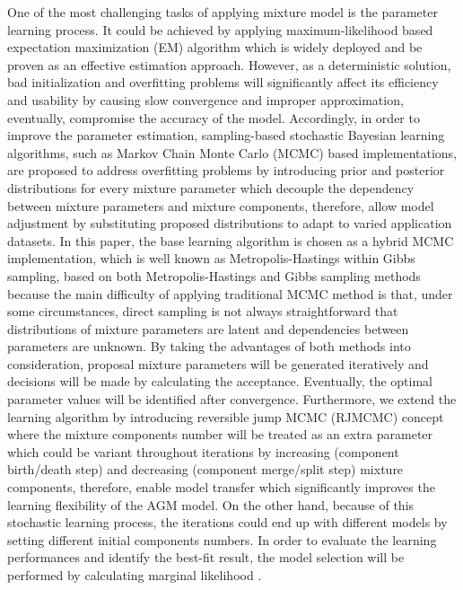 \documentclass[conference]{IEEEtran}
\begin{document}
One of the most challenging tasks of applying mixture model is the parameter learning process. It could be achieved by applying maximum-likelihood based expectation maximization (EM) algorithm \cite{Dempster1977} which is widely deployed and be proven as an effective estimation approach. However, as a deterministic solution, bad initialization and overfitting problems \cite{Bouguila2009} \cite{Bouguila2012} will significantly affect its efficiency and usability by causing slow convergence and improper approximation, eventually, compromise the accuracy of the model. Accordingly, in order to improve the parameter estimation, sampling-based stochastic Bayesian learning algorithms, such as Markov Chain Monte Carlo (MCMC) based implementations, are proposed to address overfitting problems by introducing prior and posterior distributions for every mixture parameter which decouple the dependency between mixture parameters and mixture components, therefore, allow model adjustment by substituting proposed distributions to adapt to varied application datasets. In this paper, the base learning algorithm is chosen as a hybrid MCMC implementation, which is well known as Metropolis-Hastings within Gibbs sampling\cite{Bouguila2009}, based on both Metropolis-Hastings \cite{Hastings1970} and Gibbs sampling \cite{Geman1987} methods because the main difficulty of applying traditional MCMC method is that, under some circumstances, direct sampling is not always straightforward that distributions of mixture parameters are latent and dependencies between parameters are unknown. By taking the advantages of both methods into consideration, proposal mixture parameters will be generated iteratively and decisions will be made by calculating the acceptance. Eventually, the optimal parameter values will be identified after convergence. Furthermore, we extend the learning algorithm by introducing reversible jump MCMC (RJMCMC)\cite{Bouguila2012} concept where the mixture components number will be treated as an extra parameter which could be variant throughout iterations by increasing (component birth/death step) and decreasing (component merge/split step) mixture components, therefore, enable model transfer which significantly improves the learning flexibility of the AGM model. On the other hand, because of this stochastic learning process, the iterations could end up with different models by setting different initial components numbers. In order to evaluate the learning performances and identify the best-fit result, the model selection will be performed by calculating marginal likelihood \cite{Bouguila2009}.
\end{document}
